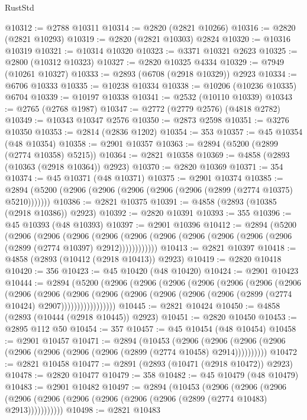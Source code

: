\begin{lexlean}{RustStd}
\begin{coremodule}
@10312 := @2788 @10311
@10314 := @2820 (@2821 @10266)
@10316 := @2820 (@2821 @10293)
@10319 := @2820 (@2821 @10303) @2824
@10320 := @10316 @10319
@10321 := @10314 @10320
@10323 := @3371 @10321 @2623
@10325 := @2800 (@10312 @10323)
@10327 := @2820 @10325 @4334
@10329 := @7949 (@10261 @10327)
@10333 := @2893 (@6708 (@2918 @10329)) @2923
@10334 := @6706 @10333
@10335 := @10238 @10334
@10338 := @10206 (@10236 @10335) @6704
@10339 := @10197 @10338
@10341 := @2532 (@10110 @10339)
@10343 := @2765 (@2768 @1987)
@10347 := @2772 (@2779 @2576) (@4818 @2782)
@10349 := @10343 @10347 @2576
@10350 := @2873 @2598
@10351 := @3276 @10350
@10353 := @2814 (@2836 @1202)
@10354 := 353
@10357 := @45 @10354 (@48 @10354)
@10358 := @2901 @10357
@10363 := @2894 (@5200 (@2899 (@2774 @10358) @5215))
@10364 := @2821 @10358
@10369 := @4858 (@2893 (@10363 (@2918 @10364)) @2923)
@10370 := @2820 @10369
@10371 := 354
@10374 := @45 @10371 (@48 @10371)
@10375 := @2901 @10374
@10385 := @2894 (@5200 (@2906 (@2906 (@2906 (@2906 (@2906 (@2899 (@2774 @10375) @5210)))))))
@10386 := @2821 @10375
@10391 := @4858 (@2893 (@10385 (@2918 @10386)) @2923)
@10392 := @2820 @10391
@10393 := 355
@10396 := @45 @10393 (@48 @10393)
@10397 := @2901 @10396
@10412 := @2894
    (@5200
      (@2906
        (@2906
          (@2906
            (@2906 (@2906 (@2906 (@2906 (@2906 (@2906 (@2906 (@2899 (@2774 @10397) @2912))))))))))))
@10413 := @2821 @10397
@10418 := @4858 (@2893 (@10412 (@2918 @10413)) @2923)
@10419 := @2820 @10418
@10420 := 356
@10423 := @45 @10420 (@48 @10420)
@10424 := @2901 @10423
@10444 := @2894
    (@5200
      (@2906
        (@2906
          (@2906
            (@2906
              (@2906
                (@2906
                  (@2906
                    (@2906
                      (@2906
                        (@2906
                          (@2906
                            (@2906 (@2906 (@2906 (@2906 (@2899 (@2774 @10424) @2907)))))))))))))))))
@10445 := @2821 @10424
@10450 := @4858 (@2893 (@10444 (@2918 @10445)) @2923)
@10451 := @2820 @10450
@10453 := @2895 @112 @50
@10454 := 357
@10457 := @45 @10454 (@48 @10454)
@10458 := @2901 @10457
@10471 := @2894
    (@10453
      (@2906 (@2906 (@2906 (@2906 (@2906 (@2906 (@2906 (@2906 (@2899 (@2774 @10458) @2914))))))))))
@10472 := @2821 @10458
@10477 := @2891 (@2893 (@10471 (@2918 @10472)) @2923)
@10478 := @2820 @10477
@10479 := 358
@10482 := @45 @10479 (@48 @10479)
@10483 := @2901 @10482
@10497 := @2894
    (@10453
      (@2906
        (@2906
          (@2906 (@2906 (@2906 (@2906 (@2906 (@2906 (@2906 (@2899 (@2774 @10483) @2913)))))))))))
@10498 := @2821 @10483

\end{coremodule}
\end{lexlean}
